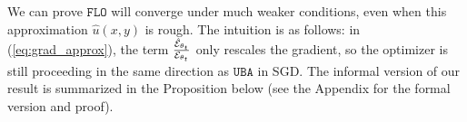 \documentclass{article}
\theoremstyle{plain}
\theoremstyle{definition}
\theoremstyle{remark}
\newcommand{\UBA}{\texttt{UBA}}
\newcommand{\FLO}{\texttt{FLO}}
\begin{document}
		
		
		We can prove $\FLO$ will converge under much weaker conditions, even when this approximation $\hat{u}(x,y)$ is rough. The intuition is as follows: in (\ref{eq:grad_approx}), the term $\frac{\hat{\mathcal{E}}_{\theta_t}}{\mathcal{E}_{\theta_t}}$  only rescales the gradient, so the optimizer is still proceeding in the same direction as $\UBA$ in SGD. The informal version of our result is summarized in the Proposition below (see the Appendix for the formal version and proof).
		
\end{document}
